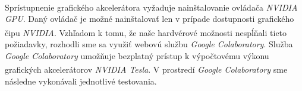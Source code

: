 Sprístupnenie grafického akcelerátora vyžaduje nainštalovanie ovládača \textit{NVIDIA\textsuperscript{\textregistered} GPU}. Daný ovládač je možné nainštalovať len v prípade dostupnosti grafického čipu \textit{NVIDIA\textsuperscript{\textregistered}}. Vzhľadom k tomu, že naše hardvérové možnosti nespĺňali tieto požiadavky, rozhodli sme sa využiť webovú službu \textit{Google Colaboratory}. Služba \textit{Google Colaboratory} umožňuje bezplatný prístup k výpočtovému výkonu grafických akcelerátorov \textit{NVIDIA\textsuperscript{\textregistered} Tesla}. V prostredí \textit{Google Colaboratory} sme následne vykonávali jednotlivé testovania.
